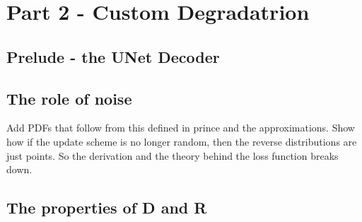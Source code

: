 \documentclass[11pt]{article}
\begin{document}


\section{Part 2 - Custom Degradatrion}
\subsection{Prelude - the UNet Decoder}
\subsection{The role of noise}
Add PDFs that follow from this defined in prince and the approximations.
Show how if the update scheme is no longer random, then the reverse distributions are just points.
So the derivation and the theory behind the loss function breaks down.
\subsection{The properties of D and R}



\end{document}
